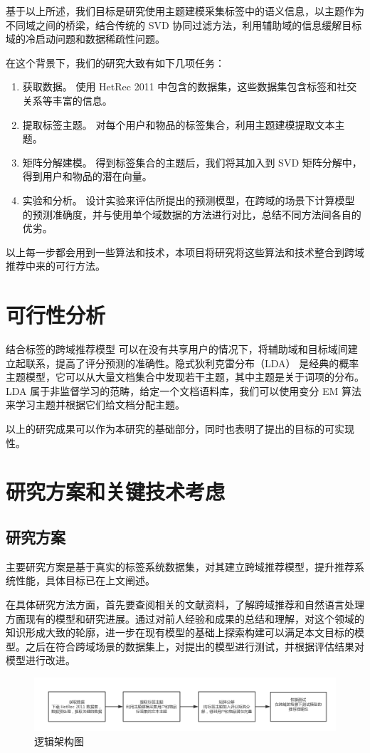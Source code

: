 基于以上所述，我们目标是研究使用主题建模采集标签中的语义信息，以主题作为不同域之间的桥梁，结合传统的 SVD 协同过滤方法，利用辅助域的信息缓解目标域的冷启动问题和数据稀疏性问题。

在这个背景下，我们的研究大致有如下几项任务：

\begin{enumerate}
\item {获取数据。} 使用 HetRec 2011 中包含的数据集，这些数据集包含标签和社交关系等丰富的信息。
\item {提取标签主题。} 对每个用户和物品的标签集合，利用主题建模提取文本主题。
\item {矩阵分解建模。} 得到标签集合的主题后，我们将其加入到 SVD 矩阵分解中，得到用户和物品的潜在向量。
\item {实验和分析。} 设计实验来评估所提出的预测模型，在跨域的场景下计算模型的预测准确度，并与使用单个域数据的方法进行对比，总结不同方法间各自的优劣。
\end{enumerate}

以上每一步都会用到一些算法和技术，本项目将研究将这些算法和技术整合到跨域推荐中来的可行方法。

\section{可行性分析}
结合标签的跨域推荐模型\cite{shi2011tags} 可以在没有共享用户的情况下，将辅助域和目标域间建立起联系，提高了评分预测的准确性。隐式狄利克雷分布（LDA）\cite{Blei2003Latent} 是经典的概率主题模型，它可以从大量文档集合中发现若干主题，其中主题是关于词项的分布。LDA 属于非监督学习的范畴，给定一个文档语料库，我们可以使用变分 EM 算法来学习主题并根据它们给文档分配主题。

以上的研究成果可以作为本研究的基础部分，同时也表明了提出的目标的可实现性。

\section{研究方案和关键技术考虑}
\subsection{研究方案} %
\label{sub:研究方案}
主要研究方案是基于真实的标签系统数据集，对其建立跨域推荐模型，提升推荐系统性能，具体目标已在上文阐述。

在具体研究方法方面，首先要查阅相关的文献资料，了解跨域推荐和自然语言处理方面现有的模型和研究进展。通过对前人经验和成果的总结和理解，对这个领域的知识形成大致的轮廓，进一步在现有模型的基础上探索构建可以满足本文目标的模型。之后在符合跨域场景的数据集上，对提出的模型进行测试，并根据评估结果对模型进行改进。
\begin{figure}[h]
\includegraphics[width=\linewidth]{images/毕设-开题-逻辑架构图.png}
\caption{逻辑架构图}
\label{fig:fig1}
\end{figure}

